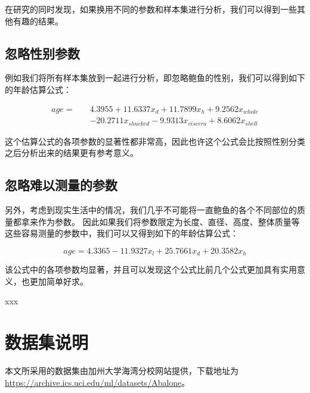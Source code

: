 \documentclass[hyperref,UTF8,12pt,a4paper]{ctexart}
\begin{document}
在研究的同时发现，如果换用不同的参数和样本集进行分析，我们可以得到一些其他有趣的结果。

\subsection{忽略性别参数}

例如我们将所有样本集放到一起进行分析，即忽略鲍鱼的性别，我们可以得到如下的年龄估算公式：

\begin{equation}
  \begin{aligned}
    age =\quad & 4.3955 + 11.6337 x_d + 11.7899 x_h +  9.2562 x_{whole}  \\
    &-20.2711 x_{shucked} -9.9313 x_{viscera} + 8.6062 x_{shell}
  \end{aligned}
\end{equation}

这个估算公式的各项参数的显著性都非常高，因此也许这个公式会比按照性别分类之后分析出来的结果更有参考意义。

\subsection{忽略难以测量的参数}

另外，考虑到现实生活中的情况，我们几乎不可能将一直鲍鱼的各个不同部位的质量都拿来作为参数。
因此如果我们将参数限定为长度、直径、高度、整体质量等这些容易测量的参数中，我们可以又得到如下的年龄估算公式：

\begin{equation}
  age = 4.3365 - 11.9327 x_l + 25.7661 x_d + 20.3582 x_h
\end{equation}

该公式中的各项参数均显著，并且可以发现这个公式比前几个公式更加具有实用意义，也更加简单好求。

\newpage



\begin{thebibliography}{99}
 xxx
\end{thebibliography}

\newpage

\appendix

\section{数据集说明}

本文所采用的数据集由加州大学海湾分校网站提供，下载地址为 \url{https://archive.ics.uci.edu/ml/datasets/Abalone}。
\end{document}
